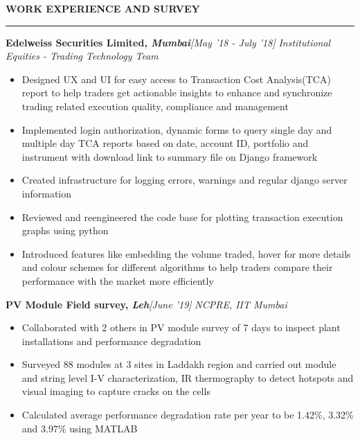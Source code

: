 \documentclass[10 pt]{article}%
\begin{document}
\vspace*{4.2cm}

\begin{flushleft}\textbf{\Large{WORK EXPERIENCE AND SURVEY}}\end{flushleft}
\vspace{-1mm}
\hrule
\vspace{1 pt}
{\flushleft \bf {\large{Edelweiss Securities Limited}}, \em{Mumbai}}\hfill {{{\em{[May '18 - July '18]}}}}
\vspace{-0.8em}
{\flushleft \em{Institutional Equities - Trading Technology Team}}
\vspace{-5pt}
\begin{itemize}[leftmargin=*]
    \setlength\itemsep{1.5pt}
    \setlength\parskip{1.5pt}
    \item Designed UX and UI for easy access to Transaction Cost Analysis(TCA) report to help traders get actionable insights to enhance and synchronize trading related execution quality, compliance and management
	\item Implemented login authorization, dynamic forms to query single day and multiple day TCA reports based on date, account ID, portfolio and instrument with download link to summary file on Django framework
	\item Created infrastructure for logging errors, warnings and regular django server information
	\item Reviewed and reengineered the code base for plotting transaction execution graphs using python
	\item Introduced features like embedding the volume traded, hover for more details and colour schemes for different algorithms to help traders compare their performance with the market more efficiently
\end{itemize}

{\flushleft \bf {\large{PV Module Field survey}}, \em{Leh}}\hfill {{{\em{[June '19]}}}}
\vspace{-0.8em}
{\flushleft \em{NCPRE, IIT Mumbai}}
\vspace{-5pt}
\begin{itemize}[leftmargin=*]
\setlength\itemsep{1.5pt}
\setlength\parskip{1.5pt}
\item Collaborated with 2 others in PV module survey of 7 days to inspect plant installations and performance degradation
\item Surveyed 88 modules at 3 sites in Laddakh region and carried out module and string level I-V characterization, IR thermography to detect hotspots and visual imaging to capture cracks on the cells
\item Calculated average performance degradation rate per year to be  1.42\%, 3.32\% and 3.97\% using MATLAB
\end{itemize}
\end{document}
